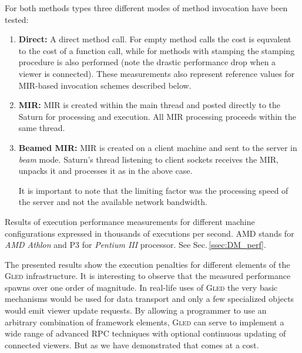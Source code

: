 \documentclass[final]{siamltex}
\def\gled{\textsc{Gled}\xspace}
\begin{document}
For both methods types three different modes of method invocation have
been tested:
\begin{enumerate}
  
\item \textbf{Direct:} A direct method call. For empty method calls
  the cost is equvalent to the cost of a function call, while for
  methods with stamping the stamping procedure is also performed (note
  the drastic performance drop when a viewer is connected). These
  measurements also represent reference values for MIR-based
  invocation schemes described below.
  
\item \textbf{MIR:} MIR is created within the main thread and
  posted directly to the Saturn for processing and execution. All
  MIR processing proceeds within the same thread.
  
\item \textbf{Beamed MIR:} MIR is created on a client machine and sent
  to the server in \emph{beam} mode. Saturn's thread listening to client
  sockets receives the MIR, unpacks it and processes it as in the
  above case.
  
  It is important to note that the limiting factor was the processing
  speed of the server and not the available network bandwidth.

\end{enumerate}

\begin{table}[htbp]
  \def\valerr#1#2{#1}
  \small
  \centering
  
  \smallskip
  \caption{Results of execution performance measurements for different
    machine configurations expressed in thousands of executions per second.
    AMD stands for \emph{AMD Athlon} and P3 for \emph{Pentium III}
    processor. See Sec.\,\ref{ssec:DM_perf}.
    }
  \label{tab:MIRperf}
\end{table}

The presented results show the execution penalties for different
elements of the \gled infrastructure. It is interesting to observe
that the measured performance spawns over one order of magnitude. In
real-life uses of \gled the very basic mechanisms would be used for
data transport and only a few specialized objects would emit viewer
update requests. By allowing a programmer to use an arbitrary
combination of framework elements, \gled can serve to implement a wide
range of advanced RPC techniques with optional continuous updating of
connected viewers. But as we have demonstrated that comes at a cost.
\end{document}
